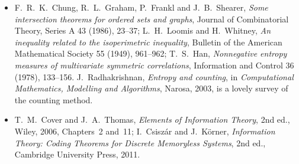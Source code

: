 \begin{itemize}
\item F.~R.~K.~Chung, R.~L.~Graham, P.~Frankl and J.~B.~Shearer, \emph{Some intersection theorems for ordered sets and graphs}, Journal of Combinatorial Theory, Series A 43 (1986), 23--37; L.~H.~Loomis and H.~Whitney, \emph{An inequality related to the isoperimetric inequality}, Bulletin of the American Mathematical Society 55 (1949), 961--962; T.~S.~Han, \emph{Nonnegative entropy measures of multivariate symmetric correlations}, Information and Control 36 (1978), 133--156. J.~Radhakrishnan, \emph{Entropy and counting}, in \emph{Computational Mathematics, Modelling and Algorithms}, Narosa, 2003, is a lovely survey of the counting method.
\item T.~M.~Cover and J.~A.~Thomas, \emph{Elements of Information Theory}, 2nd ed., Wiley, 2006, Chapters~2 and~11; I.~Csisz\'ar and J.~K\"orner, \emph{Information Theory: Coding Theorems for Discrete Memoryless Systems}, 2nd ed., Cambridge University Press, 2011.
\end{itemize}
